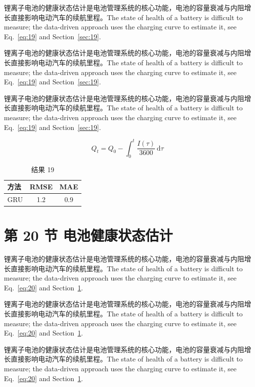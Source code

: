 \documentclass[UTF8,fontset=mac]{ctexart}
\begin{document}
锂离子电池的健康状态估计是电池管理系统的核心功能，电池的容量衰减与内阻增长直接影响电动汽车的续航里程\cite{a2020}。The state of health of a battery is difficult to measure; the data-driven approach uses the charging curve to estimate it, see Eq.~\eqref{eq:19} and Section~\ref{sec:19}.

锂离子电池的健康状态估计是电池管理系统的核心功能，电池的容量衰减与内阻增长直接影响电动汽车的续航里程\cite{a2020}。The state of health of a battery is difficult to measure; the data-driven approach uses the charging curve to estimate it, see Eq.~\eqref{eq:19} and Section~\ref{sec:19}.

锂离子电池的健康状态估计是电池管理系统的核心功能，电池的容量衰减与内阻增长直接影响电动汽车的续航里程\cite{a2020}。The state of health of a battery is difficult to measure; the data-driven approach uses the charging curve to estimate it, see Eq.~\eqref{eq:19} and Section~\ref{sec:19}.

\begin{equation}\label{eq:19}
  Q_t = Q_0 - \int_0^t \frac{I(\tau)}{3600}\,\mathrm{d}\tau
\end{equation}
\begin{table}[h]\centering\begin{tabular}{lcc}\toprule 方法 & RMSE & MAE\\\midrule GRU & 1.2 & 0.9\\\bottomrule\end{tabular}\caption{结果 19}\end{table}

\section{第 20 节 电池健康状态估计}\label{sec:20}
锂离子电池的健康状态估计是电池管理系统的核心功能，电池的容量衰减与内阻增长直接影响电动汽车的续航里程\cite{a2020}。The state of health of a battery is difficult to measure; the data-driven approach uses the charging curve to estimate it, see Eq.~\eqref{eq:20} and Section~\ref{sec:20}.

锂离子电池的健康状态估计是电池管理系统的核心功能，电池的容量衰减与内阻增长直接影响电动汽车的续航里程\cite{a2020}。The state of health of a battery is difficult to measure; the data-driven approach uses the charging curve to estimate it, see Eq.~\eqref{eq:20} and Section~\ref{sec:20}.

锂离子电池的健康状态估计是电池管理系统的核心功能，电池的容量衰减与内阻增长直接影响电动汽车的续航里程\cite{a2020}。The state of health of a battery is difficult to measure; the data-driven approach uses the charging curve to estimate it, see Eq.~\eqref{eq:20} and Section~\ref{sec:20}.
\end{document}
